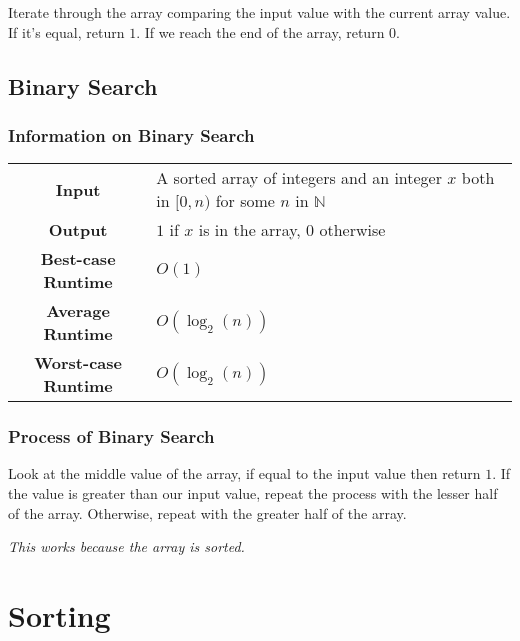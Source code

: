 \documentclass[a4paper, 12pt, twoside]{article}
\begin{document}
Iterate through the array comparing the input value with the current
array value. If it's equal, return $1$. If we reach the end of the
array, return $0$.

\subsection{Binary Search}

\subsubsection{Information on Binary Search}

\begin{center}
      \begin{tabular}{ || c | p{8.5cm} || }
            \hline
                  \textbf{Input} & A sorted array of integers and 
                        an integer $x$ both in $[0, n)$ for some $n$
                        in $\mathbb{N}$ \\
                  \textbf{Output} & $1$ if $x$ is in the array, $0$
                        otherwise \\
            \hline\hline
                  \textbf{Best-case Runtime} & $O(1)$ \\
                  \textbf{Average Runtime} & $O(\log_2(n))$ \\
                  \textbf{Worst-case Runtime} & $O(\log_2(n))$ \\
            \hline
      \end{tabular}
\end{center}

\subsubsection{Process of Binary Search}

Look at the middle value of the array, if equal to the input value
then return $1$. If the value is greater than our input value, repeat
the process with the lesser half of the array. Otherwise, repeat with
the greater half of the array.

\vspace{\baselineskip}

\textit{This works because the array is sorted.}

\section{Sorting}
\end{document}
